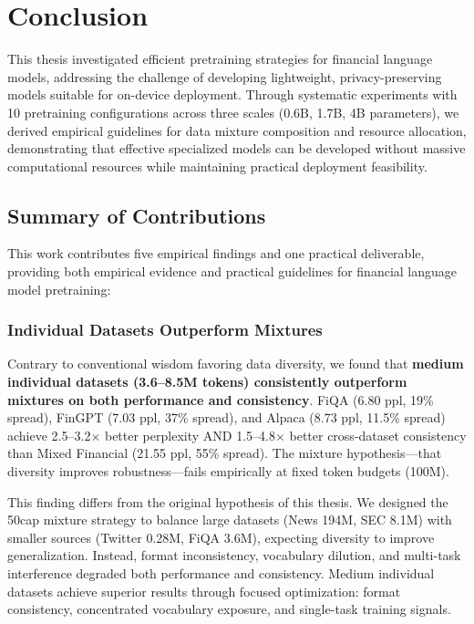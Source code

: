 \chapter{Conclusion}

This thesis investigated efficient pretraining strategies for financial language models, addressing the challenge of developing lightweight, privacy-preserving models suitable for on-device deployment. Through systematic experiments with 10 pretraining configurations across three scales (0.6B, 1.7B, 4B parameters), we derived empirical guidelines for data mixture composition and resource allocation, demonstrating that effective specialized models can be developed without massive computational resources while maintaining practical deployment feasibility.

\section{Summary of Contributions}

This work contributes five empirical findings and one practical deliverable, providing both empirical evidence and practical guidelines for financial language model pretraining:

\subsection{Individual Datasets Outperform Mixtures}

Contrary to conventional wisdom favoring data diversity, we found that \textbf{medium individual datasets (3.6–8.5M tokens) consistently outperform mixtures on both performance and consistency}. FiQA (6.80 ppl, 19\% spread), FinGPT (7.03 ppl, 37\% spread), and Alpaca (8.73 ppl, 11.5\% spread) achieve 2.5–3.2$\times$ better perplexity AND 1.5–4.8$\times$ better cross-dataset consistency than Mixed Financial (21.55 ppl, 55\% spread). The mixture hypothesis—that diversity improves robustness—fails empirically at fixed token budgets (100M).

This finding differs from the original hypothesis of this thesis. We designed the 50cap mixture strategy to balance large datasets (News 194M, SEC 8.1M) with smaller sources (Twitter 0.28M, FiQA 3.6M), expecting diversity to improve generalization. Instead, format inconsistency, vocabulary dilution, and multi-task interference degraded both performance and consistency. Medium individual datasets achieve superior results through focused optimization: format consistency, concentrated vocabulary exposure, and single-task training signals.

